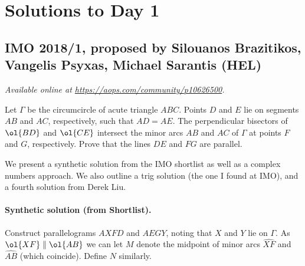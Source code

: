 \documentclass[11pt]{scrartcl}
\begin{document}
\pagebreak

\section{Solutions to Day 1}
\subsection{IMO 2018/1, proposed by Silouanos Brazitikos, Vangelis Psyxas, Michael Sarantis (HEL)}
\textsl{Available online at \url{https://aops.com/community/p10626500}.}
\begin{mdframed}[style=mdpurplebox,frametitle={Problem statement}]
Let $\Gamma$ be the circumcircle of acute triangle $ABC$.
Points $D$ and $E$ lie on segments $AB$ and $AC$,
respectively, such that $AD = AE$.
The perpendicular bisectors of $\ol{BD}$ and $\ol{CE}$
intersect the minor arcs $AB$ and $AC$ of $\Gamma$
at points $F$ and $G$, respectively.
Prove that the lines $DE$ and $FG$ are parallel.
\end{mdframed}
We present a synthetic solution from the IMO shortlist
as well as a complex numbers approach.
We also outline a trig solution (the one I found at IMO),
and a fourth solution from Derek Liu.


\paragraph{Synthetic solution (from Shortlist).}
Construct parallelograms $AXFD$ and $AEGY$,
noting that $X$ and $Y$ lie on $\Gamma$.
As $\ol{XF} \parallel \ol{AB}$ we can let $M$
denote the midpoint of minor arcs $\widehat{XF}$ and $\widehat{AB}$
(which coincide). Define $N$ similarly.
\end{document}
